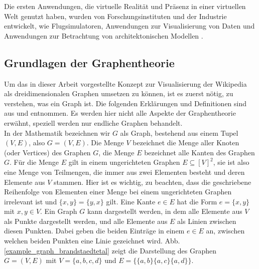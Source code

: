 \documentclass[12pt, a4paper]{article}
\begin{document}
Die ersten Anwendungen, die virtuelle Realität und Präsenz in einer virtuellen Welt genutzt haben, wurden von Forschungsinstituten und der Industrie entwickelt, wie Flugsimulatoren, Anwendungen zur Visualisierung von Daten und Anwendungen zur Betrachtung von architektonischen Modellen \cite[S.~6]{mazuryk1996virtual}.\\

\newpage
\subsection{Grundlagen der Graphentheorie}
Um das in dieser Arbeit vorgestellte Konzept zur Visualisierung der Wikipedia als dreidimensionalen Graphen umsetzen zu können, ist es zuerst nötig, zu verstehen, was ein Graph ist.  Die folgenden Erklärungen und Definitionen sind aus  und  entnommen. Es werden hier nicht alle Aspekte der Graphentheorie erwähnt, speziell werden nur endliche Graphen behandelt.\\

In der Mathematik bezeichnen wir $G$ als Graph, bestehend aus einem Tupel $(V, E)$, also $G=(V,E)$. Die Menge $V$ bezeichnet die Menge aller Knoten (oder Vertices) des Graphen $G$, die Menge $E$ bezeichnet alle Kanten des Graphen $G$. Für die Menge $E$ gilt in einem ungerichteten Graphen $E \subseteq [V]^2$, sie ist also eine Menge von Teilmengen, die immer aus zwei Elementen besteht und deren Elemente aus $V$ stammen. Hier ist es wichtig, zu beachten, dass die geschriebene Reihenfolge von Elementen einer Menge bei einem ungerichteten Graphen irrelevant ist und $\{x, y\} = \{y, x\}$ gilt. Eine Kante $e \in E$ hat die Form $e = \{x, y\}$ mit $x,y \in V$. Ein Graph $G$ kann dargestellt werden, in dem alle Elemente aus $V$ als Punkte dargestellt werden, und alle Elemente aus $E$ als Linien zwischen diesen Punkten. Dabei geben die beiden Einträge in einem $e \in E$ an, zwischen welchen beiden Punkten eine Linie gezeichnet wird. Abb. \ref{example_graph_brandstaedtetal} zeigt die Darstellung des Graphen $G = (V, E)$ mit $V = \{a, b, c, d\}$ und $E = \{\{a, b\}\{a, c\}\{a, d\}\}$.\\
\end{document}
